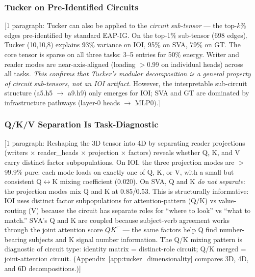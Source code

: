 \documentclass[11pt]{article}
\begin{document}

\subsubsection{Tucker on Pre-Identified Circuits}

[1 paragraph: Tucker can also be applied to the \emph{circuit sub-tensor}
--- the top-$k$\% edges pre-identified by standard EAP-IG. On the top-1\%
sub-tensor (698 edges), Tucker (10,10,8) explains 93\% variance on IOI,
95\% on SVA, 79\% on GT. The core tensor is sparse on all three tasks:
3--5 entries for 50\% energy. Writer and reader modes are near-axis-aligned
(loading $>$0.99 on individual heads) across all tasks. \emph{This confirms
that Tucker's modular decomposition is a general property of circuit
sub-tensors, not an IOI artifact.} However, the interpretable sub-circuit
structure (a5.h5 $\to$ a9.h9) only emerges for IOI; SVA and GT are
dominated by infrastructure pathways (layer-0 heads $\to$ MLP0).]


\subsubsection{Q/K/V Separation Is Task-Diagnostic}


[1 paragraph: Reshaping the 3D tensor into 4D by separating reader
projections (writers $\times$ reader\_heads $\times$ projection $\times$
factors) reveals whether Q, K, and V carry distinct factor subpopulations.
On IOI, the three projection modes are $>$99.9\% pure: each mode loads
on exactly one of Q, K, or V, with a small but consistent Q$\leftrightarrow$K
mixing coefficient (0.020). On SVA, Q and K \emph{do not separate}:
the projection modes mix Q and K at 0.85/0.53. This is structurally
informative: IOI uses distinct factor subpopulations for attention-pattern
(Q/K) vs value-routing (V) because the circuit has separate roles for
``where to look'' vs ``what to match.'' SVA's Q and K are coupled because
subject-verb agreement works through the joint attention score $QK^\top$
--- the same factors help Q find number-bearing subjects and K signal
number information. The Q/K mixing pattern is diagnostic of circuit type:
identity matrix = distinct-role circuit; Q/K merged = joint-attention
circuit. (Appendix~\ref{app:tucker_dimensionality} compares 3D, 4D, and
6D decompositions.)]
\end{document}
